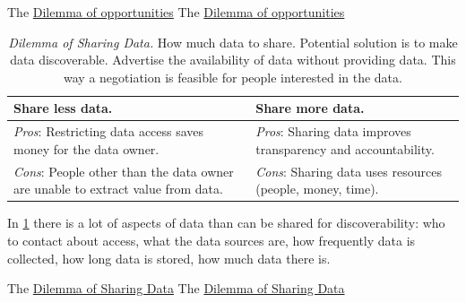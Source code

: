 The \href{table:new-opportunties}{Dilemma of opportunities}
The \href{table:new-opportunties}{Dilemma of opportunities}


\begin{center}
\begin{table}[H] %
\begin{tabular}{ | m{\dilemmatablewidth}| m{\dilemmatablewidth} | } 
  \hline
  \textbf{Share less data.} &
  \textbf{Share more data.} \\
  \hline
  \textit{Pros}: Restricting data access saves money for the data owner.&
  \textit{Pros}: Sharing data improves transparency and accountability. \\
  \hline
  \textit{Cons}: People other than the data owner are unable to extract value from data. & 
  \textit{Cons}: Sharing data uses resources (people, money, time). \\
  \hline
\end{tabular}
\caption{
\textit{Dilemma of Sharing Data.}
How much data to share. Potential solution is to make data discoverable. Advertise the availability of data without providing data. This way a negotiation is feasible for people interested in the data.
}
\label{table:data_share-vs-hide}
\end{table}
\end{center}

In \ref{table:data_share-vs-hide} there is a lot of aspects of data than can be shared for discoverability: who to contact about access, what the data sources are, how frequently data is collected, how long data is stored, how much data there is.

The \href{table:data_share-vs-hide}{Dilemma of Sharing Data}
The \href{table:data_share-vs-hide}{Dilemma of Sharing Data}


